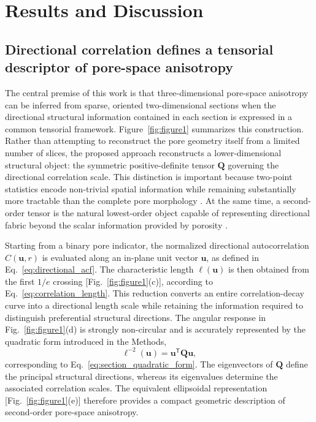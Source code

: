 \documentclass{article}
\begin{document}
\section{Results and Discussion}
\label{sec:results_discussion}

\subsection{Directional correlation defines a tensorial descriptor of pore-space anisotropy}
\label{sec:results_framework}

The central premise of this work is that three-dimensional pore-space anisotropy can be inferred from sparse, oriented two-dimensional sections when the directional structural information contained in each section is expressed in a common tensorial framework. Figure~\ref{fig:figure1} summarizes this construction. Rather than attempting to reconstruct the pore geometry itself from a limited number of slices, the proposed approach reconstructs a lower-dimensional structural object: the symmetric positive-definite tensor $\mathbf{Q}$ governing the directional correlation scale. This distinction is important because two-point statistics encode non-trivial spatial information while remaining substantially more tractable than the complete pore morphology \cite{Jiao2007}. At the same time, a second-order tensor is the natural lowest-order object capable of representing directional fabric beyond the scalar information provided by porosity \cite{Cowin2004,Inglis2003}.

Starting from a binary pore indicator, the normalized directional autocorrelation $C(\mathbf{u},r)$ is evaluated along an in-plane unit vector $\mathbf{u}$, as defined in Eq.~\eqref{eq:directional_acf}. The characteristic length $\ell(\mathbf{u})$ is then obtained from the first $1/e$ crossing [Fig.~\ref{fig:figure1}(c)], according to Eq.~\eqref{eq:correlation_length}. This reduction converts an entire correlation-decay curve into a directional length scale while retaining the information required to distinguish preferential structural directions. The angular response in Fig.~\ref{fig:figure1}(d) is strongly non-circular and is accurately represented by the quadratic form introduced in the Methods,
%
\begin{equation}
    \ell^{-2}(\mathbf{u})
    =
    \mathbf{u}^{\mathsf T}
    \mathbf{Q}
    \mathbf{u},
    \label{eq:results_tensor_reminder}
\end{equation}
%
corresponding to Eq.~\eqref{eq:section_quadratic_form}. The eigenvectors of $\mathbf{Q}$ define the principal structural directions, whereas its eigenvalues determine the associated correlation scales. The equivalent ellipsoidal representation [Fig.~\ref{fig:figure1}(e)] therefore provides a compact geometric description of second-order pore-space anisotropy.
\end{document}
